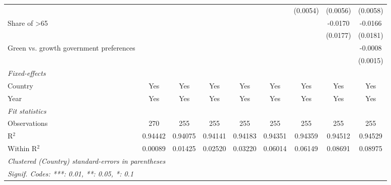 \begin{table}[htbp]
\begin{tabular}{lcccccccc}
                                                        &          &          &          &          &          & (0.0054) & (0.0056) & (0.0058)\\   
      Share of >65                                      &          &          &          &          &          &          & -0.0170  & -0.0166\\   
                                                        &          &          &          &          &          &          & (0.0177) & (0.0181)\\   
      Green vs. growth government preferences           &          &          &          &          &          &          &          & -0.0008\\   
                                                        &          &          &          &          &          &          &          & (0.0015)\\   
      \midrule
      \emph{Fixed-effects}\\
      Country                                           & Yes      & Yes      & Yes      & Yes      & Yes      & Yes      & Yes      & Yes\\  
      Year                                              & Yes      & Yes      & Yes      & Yes      & Yes      & Yes      & Yes      & Yes\\  
      \midrule
      \emph{Fit statistics}\\
      Observations                                      & 270      & 255      & 255      & 255      & 255      & 255      & 255      & 255\\  
      R$^2$                                             & 0.94442  & 0.94075  & 0.94141  & 0.94183  & 0.94351  & 0.94359  & 0.94512  & 0.94529\\  
      Within R$^2$                                      & 0.00089  & 0.01425  & 0.02520  & 0.03220  & 0.06014  & 0.06149  & 0.08691  & 0.08975\\  
      \midrule \midrule
      \multicolumn{9}{l}{\emph{Clustered (Country) standard-errors in parentheses}}\\
      \multicolumn{9}{l}{\emph{Signif. Codes: ***: 0.01, **: 0.05, *: 0.1}}\\
   \end{tabular}
\end{table}


